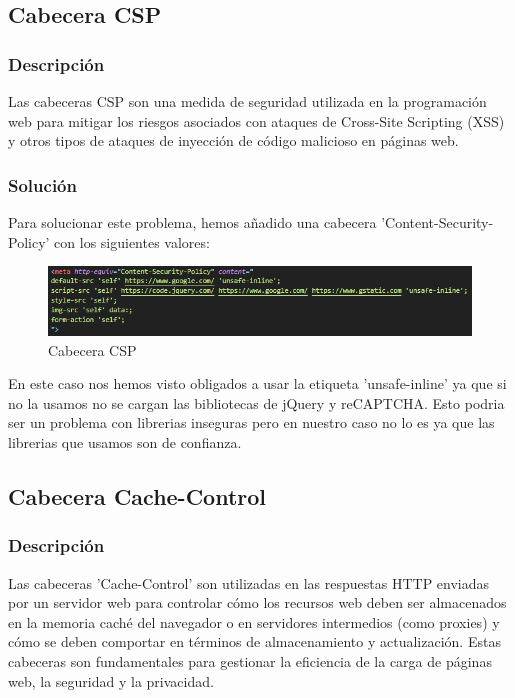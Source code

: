 \documentclass{report}
\begin{document}
            \subsection{Cabecera CSP}
                \subsubsection{Descripción}
                    Las cabeceras CSP son una medida de seguridad utilizada en la programación web para mitigar los riesgos asociados con ataques de Cross-Site Scripting (XSS) y otros tipos de ataques de inyección de código malicioso en páginas web.
                \subsubsection{Solución}
                    Para solucionar este problema, hemos añadido una cabecera 'Content-Security-Policy' con los siguientes valores:
                    \begin{figure}[H]
                        \centering
                        \includegraphics[width=\textwidth]{./img/vulnerabilidades/3.5/2.1.png}
                        \caption{Cabecera CSP}
                    \end{figure}
                    En este caso nos hemos visto obligados a usar la etiqueta 'unsafe-inline' ya que si no la usamos no se cargan las bibliotecas de jQuery y reCAPTCHA.
                    Esto podria ser un problema con librerias inseguras pero en nuestro caso no lo es ya que las librerias que usamos son de confianza.
            \clearpage
            \subsection{Cabecera Cache-Control}
                \subsubsection{Descripción}
                    Las cabeceras 'Cache-Control' son utilizadas en las respuestas HTTP enviadas por un servidor web para controlar cómo los recursos web deben ser almacenados en la memoria caché del navegador o en servidores intermedios (como proxies) y cómo se deben comportar en términos de almacenamiento y actualización. Estas cabeceras son fundamentales para gestionar la eficiencia de la carga de páginas web, la seguridad y la privacidad.
\end{document}
